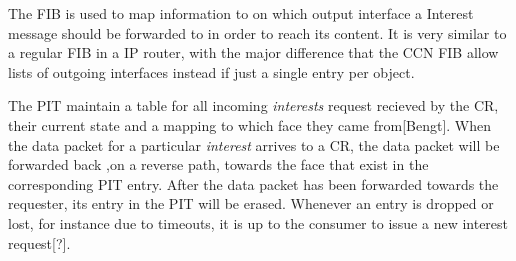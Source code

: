 The FIB is used to map information to on which output interface a Interest message should be forwarded to in order to reach its content. It is very similar to a regular FIB in a IP router, with the major difference that the CCN FIB allow lists of outgoing interfaces instead if just a single entry per object.

The PIT maintain a table for all incoming \textit{interests} request recieved by the CR, their current state and a mapping to which face they came from[Bengt]. When the data packet for a particular \textit{interest} arrives to a CR, the data packet will be forwarded back ,on a reverse path, towards the face that exist in the corresponding PIT entry. After the data packet has been forwarded towards the requester, its entry in the PIT will be erased. Whenever an entry is dropped or lost, for instance due to timeouts, it is up to the consumer to issue a new interest request[?].\

